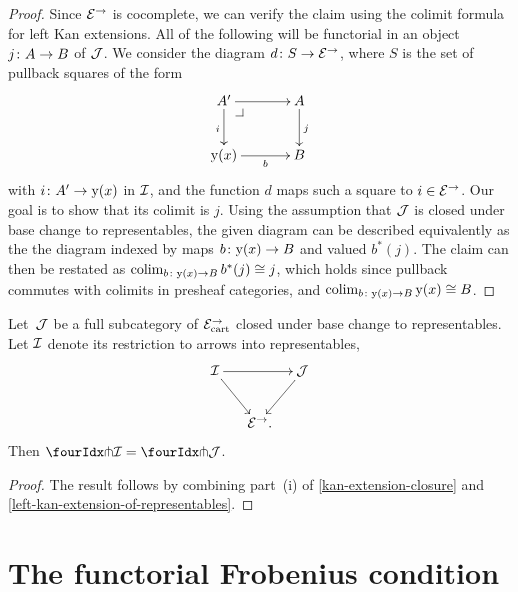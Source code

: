 \documentclass[reqno,10pt,a4paper,oneside,draft]{amsart}
\begin{document}
{{\begin{proof}
Since $\catE^\to$ is cocomplete, we can verify the claim using the colimit formula for left Kan extensions.
All of the following will be functorial in an object $j \co A \to B$ of $\cal{J}$.
We consider the diagram $d \co S \to \catE^\to$, where $S$ is the set of pullback squares of the form
\[
\xymatrix@C=1.2cm{
  A'
  \ar[r]
  \ar[d]_{i}
  \pullback{dr}
&
  A
  \ar[d]^{j}
\\
  \yon(x)
  \ar[r]_-{b}
&
  B
}
\]
with $i \co A' \to \yon(x)$ in $\cal{I}$, and the function $d$ maps such a square to $i \in \cal{E}^\to$.
Our goal is to show that its colimit is $j$.
Using the assumption that $\cal{J}$ is closed under base change to representables, the given diagram can be described equivalently as the the diagram indexed by maps $b \co \yon(x) \to B$ and valued $b^*(j)$.
The claim can then be restated as $\colim_{b \co \yon(x) \to B} b^*(j) \iso j$, which holds since pullback commutes with colimits in presheaf categories, and $\colim_{b \co \yon(x) \to B} \yon(x) \iso B$.
\end{proof}

\begin{proposition} \label{awfs-on-arrows-into-representables}
Let~$\cal{J}$ be a full subcategory of $\catE_{\cart}^\to$ closed under base change to representables.
Let $\cal{I}$ denote its restriction to arrows into representables,
\[
\xymatrix@C-1em{
  \cal{I}
  \ar[rr]
  \ar[dr]
&&
  \cal{J}
  \ar[dl]
\\&
  \catE^\to
\rlap{.}}
\]
Then $\liftr{\cal{I}} = \liftr{\cal{J}}$.
\end{proposition}

\begin{proof}
The result follows by combining part~(i) of \cref{kan-extension-closure} and \cref{left-kan-extension-of-representables}.
\end{proof}

\section{The functorial Frobenius condition}
\label{sec:frobc}

}}
\end{document}

